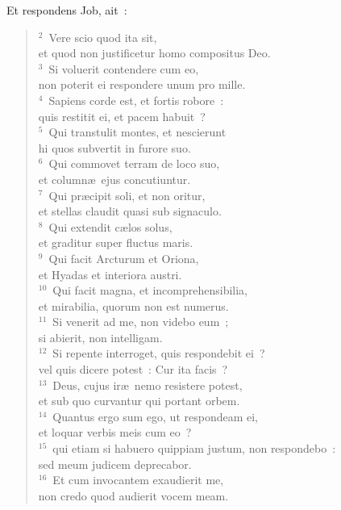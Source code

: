 \lettrine[lines=10,image=true,loversize=0.05,lraise=-0.03]{E}{}t respondens Job, ait~:
\begin{flushleft}\begin{verse}\vspace{6pt}${}^{2}$~Vere scio quod ita sit,\\ et quod non justificetur homo compositus Deo.\\
${}^{3}$~Si voluerit contendere cum eo,\\ non poterit ei respondere unum pro mille.\\
${}^{4}$~Sapiens corde est, et fortis robore~:\\ quis restitit ei, et pacem habuit~?\\
${}^{5}$~Qui transtulit montes, et nescierunt\\ hi quos subvertit in furore suo.\\
${}^{6}$~Qui commovet terram de loco suo,\\ et column\ae\ ejus concutiuntur.\\
${}^{7}$~Qui pr\ae cipit soli, et non oritur,\\ et stellas claudit quasi sub signaculo.\\
${}^{8}$~Qui extendit c\ae los solus,\\ et graditur super fluctus maris.\\
${}^{9}$~Qui facit Arcturum et Oriona,\\ et Hyadas et interiora austri.\\
${}^{10}$~Qui facit magna, et incomprehensibilia,\\ et mirabilia, quorum non est numerus.\\
${}^{11}$~Si venerit ad me, non videbo eum~;\\ si abierit, non intelligam.\\
${}^{12}$~Si repente interroget, quis respondebit ei~?\\ vel quis dicere potest~: Cur ita facis~?\\
${}^{13}$~Deus, cujus ir\ae\ nemo resistere potest,\\ et sub quo curvantur qui portant orbem.\\
${}^{14}$~Quantus ergo sum ego, ut respondeam ei,\\ et loquar verbis meis cum eo~?\\
${}^{15}$~qui etiam si habuero quippiam justum, non respondebo~:\\ sed meum judicem deprecabor.\\
${}^{16}$~Et cum invocantem exaudierit me,\\ non credo quod audierit vocem meam.\\

\end{verse}
\end{flushleft}
